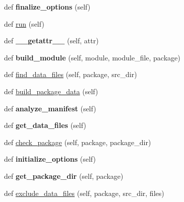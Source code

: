 \begin{DoxyCompactItemize}
\item 
\mbox{\label{classsetuptools_1_1command_1_1build__py_1_1build__py_a41b0f083dd32d4c66b613351effac975}} 
def {\bfseries finalize\+\_\+options} (self)
\item 
def \hyperlink{classsetuptools_1_1command_1_1build__py_1_1build__py_a9d6ec30f78533d2d06db30903b5ffbc1}{run} (self)
\item 
\mbox{\label{classsetuptools_1_1command_1_1build__py_1_1build__py_a2403cb67b7dea463615bcdafa21f14c3}} 
def {\bfseries \+\_\+\+\_\+getattr\+\_\+\+\_\+} (self, attr)
\item 
\mbox{\label{classsetuptools_1_1command_1_1build__py_1_1build__py_a14bbd6329de06c247a7934416d5a6ce9}} 
def {\bfseries build\+\_\+module} (self, module, module\+\_\+file, package)
\item 
def \hyperlink{classsetuptools_1_1command_1_1build__py_1_1build__py_a1bea08ff0074a9909bf9cdd649cfaa08}{find\+\_\+data\+\_\+files} (self, package, src\+\_\+dir)
\item 
def \hyperlink{classsetuptools_1_1command_1_1build__py_1_1build__py_abada4e4302bf4dbdabc9b64e63f87924}{build\+\_\+package\+\_\+data} (self)
\item 
\mbox{\label{classsetuptools_1_1command_1_1build__py_1_1build__py_a55dcdddb2d785198bcca45dc83494740}} 
def {\bfseries analyze\+\_\+manifest} (self)
\item 
\mbox{\label{classsetuptools_1_1command_1_1build__py_1_1build__py_a896019b7df2c118164543c52ebbc822a}} 
def {\bfseries get\+\_\+data\+\_\+files} (self)
\item 
def \hyperlink{classsetuptools_1_1command_1_1build__py_1_1build__py_a413157c1d6b7d6a686b410c801a4863f}{check\+\_\+package} (self, package, package\+\_\+dir)
\item 
\mbox{\label{classsetuptools_1_1command_1_1build__py_1_1build__py_ac1dedf42c24e46f783273379898dfc0c}} 
def {\bfseries initialize\+\_\+options} (self)
\item 
\mbox{\label{classsetuptools_1_1command_1_1build__py_1_1build__py_a4ecdae078542d60a4132c9a8fcbd3349}} 
def {\bfseries get\+\_\+package\+\_\+dir} (self, package)
\item 
def \hyperlink{classsetuptools_1_1command_1_1build__py_1_1build__py_a96c9d4d9ff336e71dd5d6076ae216589}{exclude\+\_\+data\+\_\+files} (self, package, src\+\_\+dir, files)
\end{DoxyCompactItemize}
